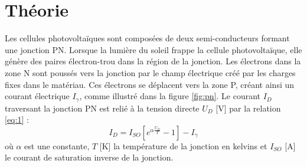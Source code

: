 \section{Théorie}

Les cellules photovoltaïques sont composées de deux semi-conducteurs formant une jonction PN. Lorsque la lumière du soleil frappe la cellule photovoltaïque, elle génère des paires électron-trou dans la région de la jonction.
Les électrons dans la zone N sont poussés vers la jonction par le champ électrique créé par les charges fixes dans le matériau. Ces électrons se déplacent vers la zone P, créant ainsi un courant électrique \(I_\gamma\), comme illustré dans la figure \ref{fig:pn}.
Le courant \(I_D\) traversant la jonction PN est relié à la tension directe \(U_D\) [\unit{\volt}] par la relation \ref{eq:1} \cite{notice}:
\begin{equation}
    I_D = I_{SO}[e^{\alpha\frac{U_D}{T}} - 1] - I_\gamma
    \label{eq:1}
\end{equation}
où \(\alpha\) est une constante, \(T\) [\unit{\kelvin}] la température de la jonction en kelvins et \(I_{SO}\) [\unit{\ampere}] le courant de saturation inverse de la jonction.

